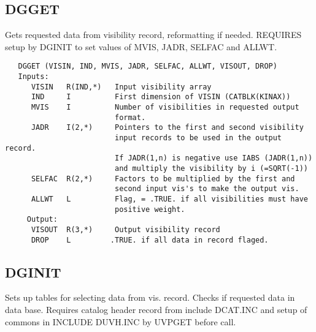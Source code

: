 \subsection{DGGET}
Gets requested data from visibility record, reformatting if needed.
REQUIRES setup by DGINIT to set values of MVIS, JADR, SELFAC and
ALLWT.
\begin{verbatim}
   DGGET (VISIN, IND, MVIS, JADR, SELFAC, ALLWT, VISOUT, DROP)
   Inputs:
      VISIN   R(IND,*)   Input visibility array
      IND     I          First dimension of VISIN (CATBLK(KINAX))
      MVIS    I          Number of visibilities in requested output
                         format.
      JADR    I(2,*)     Pointers to the first and second visibility
                         input records to be used in the output record.
                         If JADR(1,n) is negative use IABS (JADR(1,n))
                         and multiply the visibility by i (=SQRT(-1))
      SELFAC  R(2,*)     Factors to be multiplied by the first and
                         second input vis's to make the output vis.
      ALLWT   L          Flag, = .TRUE. if all visibilities must have
                         positive weight.
     Output:
      VISOUT  R(3,*)     Output visibility record
      DROP    L         .TRUE. if all data in record flaged.
\end{verbatim}

\subsection{DGINIT}
Sets up tables for selecting data from vis. record. Checks if
requested data in data base.  Requires catalog header record from
include DCAT.INC and setup of commons in INCLUDE DUVH.INC by UVPGET
before call.

